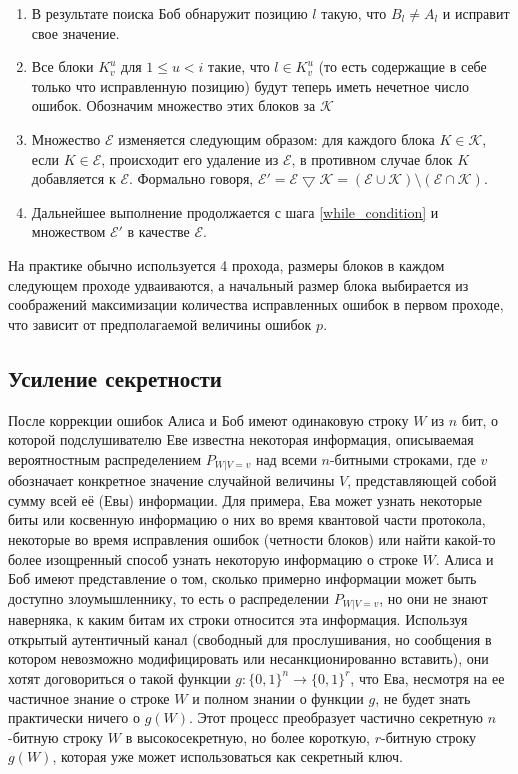 \begin{enumerate}
  \item В результате поиска Боб обнаружит позицию $l$ такую, что $B_l \neq A_l$ и исправит свое значение. 
  
  \item Все блоки $K^u_v$ для $1 \leq u < i$ такие, что $l \in K^u_v$ (то есть содержащие в себе только что исправленную позицию) будут теперь иметь нечетное число ошибок. Обозначим множество этих блоков за $\mathcal{K}$
  
  \item Множество $\mathcal{E}$ изменяется следующим образом: для каждого блока $K \in \mathcal{K}$, если $K \in \mathcal{E}$, происходит его удаление из $\mathcal{E}$, в противном случае блок $K$ добавляется к $\mathcal{E}$. Формально говоря, $\mathcal{E}' = \mathcal{E} \bigtriangledown \mathcal{K} = (\mathcal{E} \cup \mathcal{K}) \setminus (\mathcal{E} \cap \mathcal{K})$.
  
  \item Дальнейшее выполнение продолжается с шага \ref{while_condition} и множеством $\mathcal{E}'$ в качестве $\mathcal{E}$.

\end{enumerate}
На практике обычно используется 4 прохода, размеры блоков в каждом следующем проходе удваиваются, а начальный размер блока выбирается из соображений максимизации количества исправленных ошибок в первом проходе, что зависит от предполагаемой величины ошибок $p$.

\subsection{Усиление секретности}
После коррекции ошибок Алиса и Боб имеют одинаковую строку $W$ из $n$ бит, о которой подслушивателю Еве известна некоторая информация, описываемая вероятностным распределением $P_{W|V=v}$ над всеми $n$-битными строками, где $v$ обозначает конкретное значение случайной величины $V$, представляющей собой сумму всей её (Евы) информации. Для примера, Ева может узнать некоторые биты или косвенную информацию о них во время квантовой части протокола, некоторые во время исправления ошибок (четности блоков) или найти какой-то более изощренный способ узнать некоторую информацию о строке $W$. Алиса и Боб имеют представление о том, сколько примерно информации может быть доступно злоумышленнику, то есть о распределении $P_{W|V=v}$, но они не знают наверняка, к каким битам их строки относится эта информация. Используя открытый аутентичный канал (свободный для прослушивания, но сообщения в котором невозможно модифицировать или несанкционированно вставить), они хотят договориться о такой функции $g: \{0, 1\}^n \rightarrow \{0,1\}^r$, что Ева, несмотря на ее частичное знание о строке $W$ и полном знании о функции $g$, не будет знать практически ничего о $g(W)$. Этот процесс преобразует частично секретную $n$-битную строку $W$ в высокосекретную, но более короткую, $r$-битную строку $g(W)$, которая уже может использоваться как секретный ключ.

